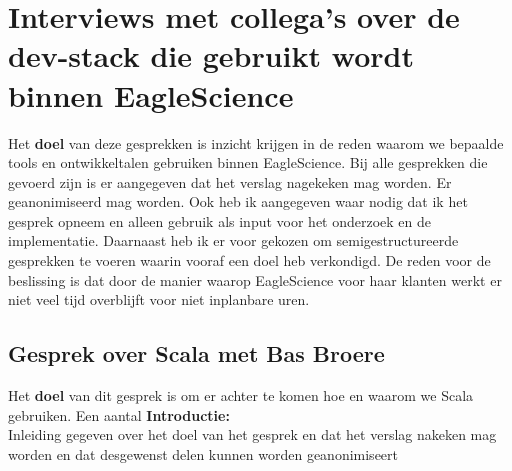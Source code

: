 \section{Interviews met collega's over de dev-stack die gebruikt wordt binnen EagleScience}\label{sec:dev-stackInterviews}

Het \textbf{doel} van deze gesprekken is inzicht krijgen in de reden waarom we bepaalde tools en ontwikkeltalen gebruiken binnen EagleScience. Bij alle gesprekken die gevoerd zijn is er aangegeven dat het verslag nagekeken mag worden. Er geanonimiseerd mag worden. Ook heb ik aangegeven waar nodig dat ik het gesprek opneem en alleen gebruik als input voor het onderzoek en de implementatie. Daarnaast heb ik er voor gekozen om semigestructureerde gesprekken te voeren waarin vooraf een doel heb verkondigd. De reden voor de beslissing is dat door de manier waarop EagleScience voor haar klanten werkt er niet veel tijd overblijft voor niet inplanbare uren.

\subsection{Gesprek over Scala met Bas Broere}\label{subsec:gesprek-over-scala-met-bas-broere}
Het \textbf{doel} van dit gesprek is om er achter te komen hoe en waarom we Scala gebruiken. Een aantal
\textbf{Introductie: }\\
Inleiding gegeven over het doel van het gesprek en dat het verslag nakeken mag worden en dat desgewenst delen kunnen worden geanonimiseert
\subsection{}\label{subsec:dev-stackVragen}

